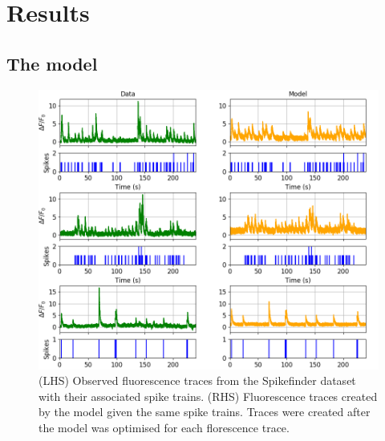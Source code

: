 \documentclass[a4paper,12pt]{article}
\theoremstyle{definition}
\begin{document}
\section{Results}

\subsection{The model}

\begin{figure}[p]
  \includegraphics[width=\textwidth]{figures/trace_comparison.png}
  \caption{(LHS) Observed fluorescence traces from the Spikefinder dataset with their associated spike trains. (RHS) Fluorescence traces created by the model given the same spike trains. Traces were created after the model was optimised for each florescence trace.}
  \label{fig:observed_modelled_examples}
\end{figure}
\end{document}
